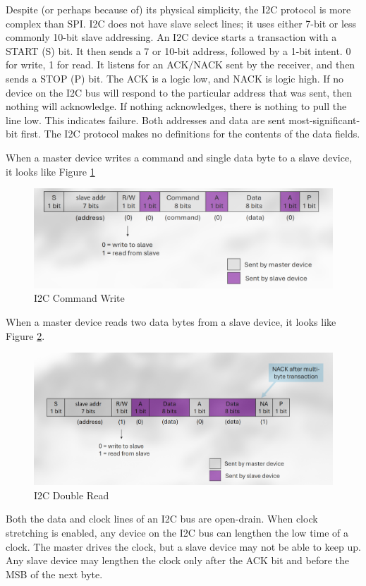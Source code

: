 Despite (or perhaps because of) its physical
simplicity, the I2C protocol is more complex
than SPI. I2C does not have slave select lines;
it uses either 7-bit or less commonly 10-bit
slave addressing. An I2C device starts a transaction with a START (S) bit.
It then sends a 7 or 10-bit address, followed
by a 1-bit intent. 0 for write, 1 for read.
It listens for an ACK/NACK sent by the receiver,
and then sends a STOP (P) bit.
The ACK is a logic low, and NACK is logic
high. If no device on the I2C bus will
respond to the particular address that
was sent, then nothing will acknowledge.
If nothing acknowledges, there is nothing
to pull the line low. This indicates
failure.
Both addresses and data are sent
most-significant-bit first.
The I2C protocol makes no definitions
for the contents of the data fields.

When a master device writes a command and single data byte to a slave device, it looks
like Figure \ref{fig:i2cwritesingle}
\begin{figure}
    \includegraphics{images/i2cwritesingle.png}
    \caption{I2C Command Write}
    \label{fig:i2cwritesingle}
\end{figure}

When a master device reads two data bytes
from a slave device, it looks
like Figure \ref{fig:i2creaddouble}.
\begin{figure}
    \includegraphics{images/i2creaddouble.png}
    \caption{I2C Double Read}
    \label{fig:i2creaddouble}
\end{figure}

Both the data and clock lines of an I2C bus are open-drain.
When clock stretching is enabled,
any device on the I2C bus can
lengthen the low time of a clock.
The master drives the clock, but a slave device
may not be able to keep up.
Any slave device may lengthen the clock only
after the ACK bit and before the MSB of
the next byte.